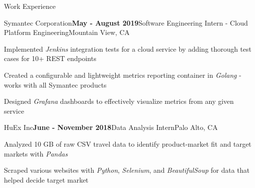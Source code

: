 \documentclass[margin,centered]{resume} %
\begin{document}
\begin{rSection}{Work Experience}

	\begin{rSubsection}{Symantec Corporation}{\textbf{May - August 2019}}{Software Engineering Intern - Cloud Platform Engineering}{Mountain View, CA}
		\item Implemented \textit{Jenkins} integration tests for a cloud service by adding thorough test cases for 10+ REST endpoints
		\item Created a configurable and lightweight metrics reporting container in \textit{Golang} - works with all Symantec products
		\item Designed \textit{Grafana} dashboards to effectively visualize metrics from any given service
	\end{rSubsection}

	\begin{rSubsection}{HuEx Inc}{\textbf{June - November 2018}}{Data Analysis Intern}{Palo Alto, CA}
		\item Analyzed 10 GB of raw CSV travel data to identify product-market fit and target markets with \textit{Pandas}
		\item Scraped various websites with \textit{Python}, \textit{Selenium}, and \textit{BeautifulSoup} for data that helped decide target market
	\end{rSubsection}

\end{rSection}
\end{document}
